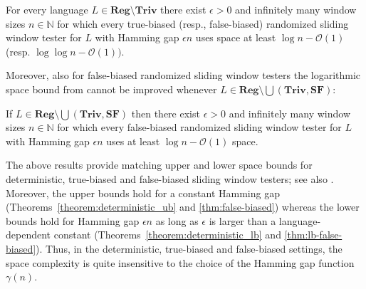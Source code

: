 \documentclass{theoretics}
\newcommand{\N}{\mathbb{N}}
\renewcommand{\O}{\mathcal{O}}
\newcommand{\Reg}{\mathbf{Reg}}
\newcommand{\Triv}{\mathbf{Triv}}
\newcommand{\SF}{\mathbf{SF}}
\begin{document}
\begin{theorem}
\label{theorem:deterministic_lb}
For every language $L \in \Reg \setminus \Triv$ there exist $\epsilon > 0$ and infinitely many window sizes $n \in \N$
for which every  true-biased (resp., false-biased) randomized sliding window tester for $L$ with Hamming gap $\epsilon n$
uses space at least $\log n - \O(1)$ (resp. $\log \log n - \O(1))$.
\end{theorem}
Moreover, also for false-biased randomized sliding window testers the 
 logarithmic space bound from  cannot be improved
whenever $L \in \Reg \setminus  \bigcup(\Triv, \SF)$:

\begin{theorem}
\label{thm:lb-false-biased}
If $L \in \Reg \setminus  \bigcup(\Triv, \SF)$ then there exist $\epsilon > 0$ and infinitely many window sizes $n \in \N$
for which every false-biased randomized sliding window tester for $L$ with Hamming gap $\epsilon n$
uses at least $\log n - \O(1)$ space. 
\end{theorem}
The above results provide matching upper and lower space bounds for deterministic, true-biased and false-biased sliding window testers; see also .
Moreover, the upper bounds hold for a constant Hamming gap (Theorems~\ref{theorem:deterministic_ub} and \ref{thm:false-biased}) 
whereas the lower bounds hold for Hamming gap $\epsilon n$ as long as $\epsilon$ is larger than a language-dependent constant (Theorems~\ref{theorem:deterministic_lb} and \ref{thm:lb-false-biased}).
Thus, in the deterministic, true-biased and false-biased settings, the space complexity is quite insensitive to the choice of the Hamming gap function $\gamma(n)$. 
\end{document}
